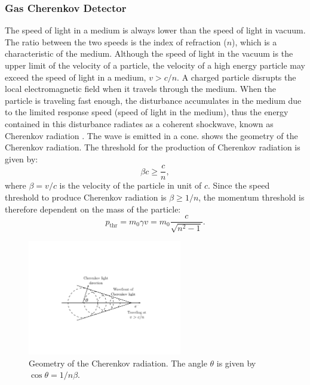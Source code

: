 \subsubsection{Gas Cherenkov Detector}

The speed of light in a medium is always lower than the speed of light in vacuum. The ratio between the two speeds is the index of refraction ($n$), which is a characteristic of the medium. Although the speed of light in the vacuum is the upper limit of the velocity of a particle, the velocity of a high energy particle may exceed the speed of light in a medium, $v>c/n$. A charged particle disrupts the local electromagnetic field when it travels through the medium. When the particle is traveling fast enough, the disturbance accumulates in the medium due to the limited response speed (speed of light in the medium), thus the energy contained in this disturbance radiates as a coherent shockwave, known as Cherenkov radiation \cite{Leo1994}. The wave is emitted in a cone.  shows the geometry of the Cherenkov radiation. The threshold for the production of Cherenkov radiation is given by:
\begin{equation} \label{C5S4SS2E3}
\beta c \geq\frac{c}{n},
\end{equation}
where $\beta=v/c$ is the velocity of the particle in unit of $c$. Since the speed threshold to produce Cherenkov radiation is $\beta\geq1/n$, the momentum threshold is therefore dependent on the mass of the particle:
\begin{equation} \label{C5S4SS2E4}
p_{\mathrm{thr}} = m_0\gamma v = m_0\frac{c}{\sqrt{n^2-1}}.
\end{equation}

\begin{figure}[tb!]
  \centering
  \includegraphics[width=0.6\textwidth]{figs/Cherenkov-radiation.pdf}
  \caption[Geometry of the Cherenkov radiation.]{Geometry of the Cherenkov radiation. The angle $\theta$ is given by $\cos\theta=1/n\beta$. \label{C5S4SS2F4}}
\end{figure}

